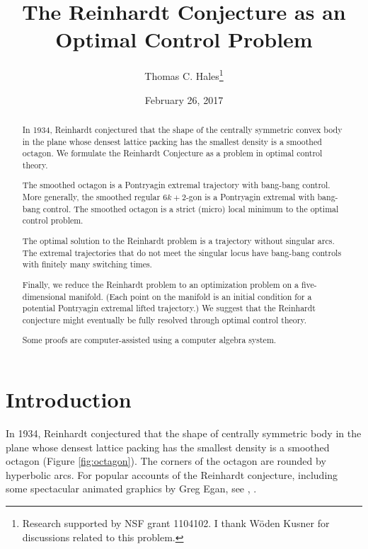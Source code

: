 \documentclass{article}
\title{The Reinhardt Conjecture as an Optimal Control Problem}
\author{Thomas C. Hales\thanks{Research supported by NSF grant
    1104102.  I thank W\"oden Kusner for discussions related to this
    problem.}}
\date{}
\date{February 26, 2017}
\theoremstyle{remark}
\begin{document}
\maketitle


\begin{abstract} 
  In 1934, Reinhardt conjectured that the shape of the centrally
  symmetric convex body in the plane whose densest lattice packing has
  the smallest density is a smoothed octagon.  We formulate the
  Reinhardt Conjecture as a problem in optimal control theory.

  The smoothed octagon is a Pontryagin extremal trajectory with
  bang-bang control.  More generally, the smoothed regular $6k+2$-gon
  is a Pontryagin extremal with bang-bang control.  The smoothed
  octagon is a strict (micro) local minimum to the optimal control
  problem.
  
  The optimal solution to the Reinhardt problem is a trajectory
  without singular arcs.  The extremal trajectories that do not meet
  the singular locus have bang-bang controls with finitely many
  switching times.

  Finally, we reduce the Reinhardt problem to an optimization problem
  on a five-dimensional manifold.  (Each point on the manifold is an
  initial condition for a potential Pontryagin extremal lifted
  trajectory.)  We suggest that the Reinhardt conjecture might
  eventually be fully resolved through optimal control theory.

  Some proofs are computer-assisted using a computer algebra system.
\end{abstract}

\baselineskip
{}\baselineskip

\newenvironment{blockquote}{%
  \par%
  \medskip%
  \baselineskip=0.7\baselineskip%
  \leftskip=2em\rightskip=2em%
  \noindent\ignorespaces}{%
  \par\medskip}

\section{Introduction}

In 1934, Reinhardt conjectured that the shape of centrally symmetric
body in the plane whose densest lattice packing has the smallest
density is a smoothed octagon (Figure \ref{fig:octagon}).  The
corners of the octagon are rounded by hyperbolic arcs.  For popular
accounts of the Reinhardt conjecture, including some spectacular
animated graphics by Greg Egan, see \cite{baez-egan}, \cite{baez}.
\end{document}
